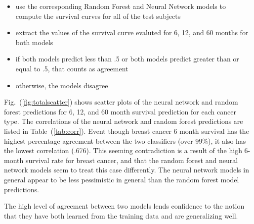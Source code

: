 \documentclass[10pt,letterpaper]{article}
\begin{document}
\begin{itemize}[noitemsep]
\item use the corresponding Random Forest and Neural Network models to compute the survival curves for all of the test subjects
\item extract the values of the survival curve evaluted for 6, 12, and 60 months for both models
\item if both models predict less than .5 or both models predict greater than or equal to .5, that counts as agreement
\item otherwise, the models disagree
\end{itemize}


Fig.~(\ref{fig:totalscatter}) shows scatter plots of the neural network and random forest predictions for 6, 12, and 60 month survival prediction for each cancer type. The correlations of the neural network and random forest predictions are listed in Table~(\ref{tab:corr}). Event though breast cancer 6 month survival has the highest percentage agreement between the two classifiers (over 99$\%$), it also has the lowest correlation (.676). This seeming contradiction is a result of the high 6-month survival rate for breast cancer, and that the random forest and neural network models seem to treat this case differently. The neural network models in general appear to be less pessimistic in general than the random forest model predictions.

The high level of agreement between two models lends confidence to the notion that they have both learned from the training data and are generalizing well. 
\end{document}
